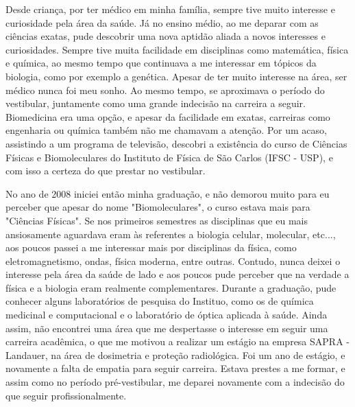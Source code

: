 \documentclass[a4paper,oneside,10pt]{article}
\begin{document}
\begin{onehalfspace}

Desde criança, por ter médico em minha família, sempre tive muito interesse e curiosidade pela área da saúde. Já no ensino médio, ao me deparar com as ciências
exatas, pude descobrir uma nova aptidão aliada a novos interesses e curiosidades. Sempre tive muita facilidade em disciplinas como matemática, física e química,
ao mesmo tempo que continuava a me interessar em tópicos da biologia, como por exemplo a genética. Apesar de ter muito interesse na área, ser médico nunca foi 
meu sonho. Ao mesmo tempo, se aproximava o período do vestibular, juntamente como uma grande indecisão na carreira a seguir. Biomedicina era uma opção, e apesar 
da facilidade em exatas, carreiras como engenharia ou química também não me chamavam a atenção. Por um acaso, assistindo a um programa de televisão, descobri a 
existência do curso de Ciências Físicas e Biomoleculares do Instituto de Física de São Carlos (IFSC - USP), e com isso a certeza do que prestar no vestibular.

No ano de 2008 iniciei então minha graduação, e não demorou muito para eu perceber que apesar do nome "Biomoleculares", o curso estava mais para "Ciências Físicas".
Se nos primeiros semestres as disciplinas que eu mais ansiosamente aguardava eram às referentes a biologia celular, molecular, etc..., aos poucos passei a me 
interessar mais por disciplinas da física, como eletromagnetismo, ondas, física moderna, entre outras. Contudo, nunca deixei o interesse pela área da saúde de lado
e aos poucos pude perceber que na verdade a física e a biologia eram realmente complementares. Durante a graduação, pude conhecer alguns laboratórios de pesquisa
do Instituo, como os de química medicinal e computacional e o laboratório de óptica aplicada à saúde. Ainda assim, não encontrei uma área que me despertasse o 
interesse em seguir uma carreira acadêmica, o que me motivou a realizar um estágio na empresa SAPRA - Landauer, na área de dosimetria e proteção radiológica.
Foi um ano de estágio, e novamente a falta de empatia para seguir carreira. Estava prestes a me formar, e assim como no período pré-vestibular, me deparei 
novamente com a indecisão do que seguir profissionalmente.


\end{onehalfspace}
\end{document}
